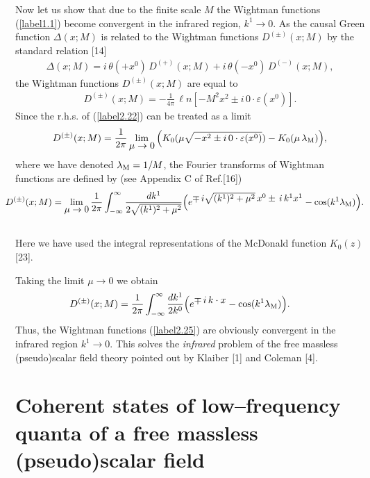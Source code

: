 \documentclass[a4paper,12pt] {article}
\begin{document}
Now let us show that due to the finite scale $M$ the Wightman
functions (\ref{label1.1}) become convergent in the infrared region,
$k^1 \to 0$. As the causal Green function $\Delta(x;M)$ is related to
the Wightman functions $D^{(\pm)}(x; M)$ by the standard relation [14]
%
\begin{eqnarray}\label{label2.21}
\Delta(x;M) = i\,\theta(+ x^0)\,D^{(+)}(x; M) +
i\,\theta(-x^0)\,D^{(-)}(x; M),
\end{eqnarray}
%
the Wightman functions $D^{(\pm)}(x; M)$ are equal to
%
\begin{eqnarray}\label{label2.22}
D^{(\pm)}(x;M) =- \frac{1}{4\pi}\,{\ell n}[-M^2x^2 \pm
i\,0\cdot\varepsilon(x^0)].
\end{eqnarray}
%
Since the r.h.s. of (\ref{label2.22}) can be treated as a limit
%
\begin{eqnarray}\label{label2.23}
D^{(\pm)}(x;M) =\frac{1}{2\pi}\lim_{\textstyle \mu \to
0}\Big(K_0(\mu \sqrt{- x^2\pm i\,0\cdot\varepsilon(x^0)}) -
K_0(\mu\,\lambda_{\rm M})\Big),
\end{eqnarray}
%
where we have denoted $\lambda_{\rm M} = 1/M$, the Fourier transforms
of Wightman functions are defined by (see Appendix C of Ref.[16])
%
\begin{eqnarray}\label{label2.24}
\hspace{-0.3in}&&D^{(\pm)}(x;M) =\lim_{\textstyle \mu\to
0}\frac{1}{2\pi}\int^{\infty}_{-\infty}\frac{dk^1}{2\sqrt{(k^1)^2 +
\mu^2}}\Big(e^{\textstyle \mp \,i\sqrt{(k^1)^2 + \mu^2}\,x^0 \pm
\,i\,k^1x^1} - \cos(k^1\lambda_{\rm M})\Big).\nonumber\\
\hspace{-0.3in}&&
\end{eqnarray}
%
Here we have used the integral representations of the McDonald
function $K_0(z)$ [23].

Taking the limit $\mu \to 0$ we obtain
%
\begin{eqnarray}\label{label2.25}
\hspace{-0.3in}D^{(\pm)}(x;M)
=\frac{1}{2\pi}\int^{\infty}_{-\infty}\frac{dk^1}{2k^0}
\Big(e^{\textstyle \mp \,i\,k\cdot x} - \cos(k^1\lambda_{\rm
M})\Big).
\end{eqnarray}
%
Thus, the Wightman functions (\ref{label2.25}) are obviously
convergent in the infrared region $k^1 \to 0$. This solves the {\it
infrared} problem of the free massless (pseudo)scalar field theory
pointed out by Klaiber [1] and Coleman [4].


\section{Coherent states of low--frequency quanta of a free
massless (pseudo)scalar field} 
\setcounter{equation}{0}
\end{document}
